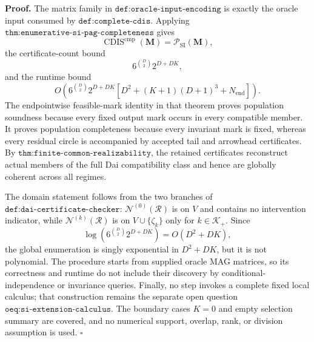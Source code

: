 \textbf{Proof.}
The matrix family in \(\texttt{def:oracle-input-encoding}\) is exactly the oracle input consumed by \(\texttt{def:complete-cdis}\).  Applying \(\texttt{thm:enumerative-si-pag-completeness}\) gives
\[
\operatorname{CDIS}^{\mathrm{cmp}}(\mathbf M)
=\mathcal P_{\mathrm{SI}}(\mathbf M),
\]
the certificate-count bound
\[
6^{\binom D2}2^{D+DK},
\]
and the runtime bound
\[
O\!\left(
6^{\binom D2}2^{D+DK}
\left[D^2+(K+1)(D+1)^3+N_{\mathrm{end}}\right]
\right).
\]
The endpointwise feasible-mark identity in that theorem proves population soundness because every fixed output mark occurs in every compatible member.  It proves population completeness because every invariant mark is fixed, whereas every residual circle is accompanied by accepted tail and arrowhead certificates.  By \(\texttt{thm:finite-common-realizability}\), the retained certificates reconstruct actual members of the full Dai compatibility class and hence are globally coherent across all regimes.

The domain statement follows from the two branches of \(\texttt{def:dai-certificate-checker}\): \(\mathcal N^{(0)}(\mathcal R)\) is on \(V\) and contains no intervention indicator, while \(\mathcal N^{(k)}(\mathcal R)\) is on \(V\cup\{\zeta_k\}\) only for \(k\in\mathcal K_+\).  Since
\[
\log\!\left(6^{\binom D2}2^{D+DK}\right)=O(D^2+DK),
\]
the global enumeration is singly exponential in \(D^2+DK\), but it is not polynomial.  The procedure starts from supplied oracle MAG matrices, so its correctness and runtime do not include their discovery by conditional-independence or invariance queries.  Finally, no step invokes a complete fixed local calculus; that construction remains the separate open question \(\texttt{oeq:si-extension-calculus}\).  The boundary cases \(K=0\) and empty selection summary are covered, and no numerical support, overlap, rank, or division assumption is used. \(\square\)